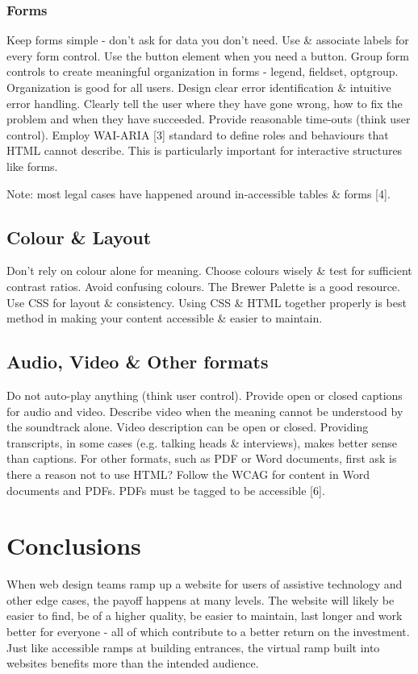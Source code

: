 \documentclass{acm_proc_article-sp}
\begin{document}
\subsubsection{Forms}
Keep forms simple - don't ask for data you don't need. Use \& associate labels for every form control. Use the button element when you need a button. Group form controls to create meaningful organization in forms - legend, fieldset, optgroup. Organization is good for all users. Design clear error identification \& intuitive error handling. Clearly tell the user where they have gone wrong, how to fix the problem and when they have succeeded. Provide reasonable time-outs (think user control). Employ WAI-ARIA [3] standard to define roles and behaviours that HTML cannot describe. This is particularly important for interactive structures like forms.

Note: most legal cases have happened around in-accessible tables \& forms [4].

\subsection{Colour \& Layout}
Don't rely on colour alone for meaning. Choose colours wisely \& test for sufficient contrast ratios. Avoid confusing colours. The Brewer Palette is a good resource. Use CSS for layout  \& consistency. Using CSS \& HTML together properly is best method in making your content accessible \& easier to maintain.

\subsection{Audio, Video \& Other formats}
Do not auto-play anything (think user control). Provide open or closed captions for audio and video. Describe video when the meaning cannot be understood by the soundtrack alone. Video description can be open or closed. Providing transcripts, in some cases (e.g. talking heads \& interviews), makes better sense than captions. For other formats, such as PDF or Word documents, first ask is there a reason not to use HTML? Follow the WCAG for content in Word documents and PDFs. PDFs must be tagged to be accessible [6].

\section{Conclusions}
When web design teams ramp up a website for users of assistive technology and other edge cases, the payoff happens at many levels. The website will likely be easier to find, be of a higher quality, be easier to maintain, last longer and work better for everyone - all of which contribute to a better return on the investment. Just like accessible ramps at building entrances, the virtual ramp built into websites benefits more than the intended audience.
\end{document}
